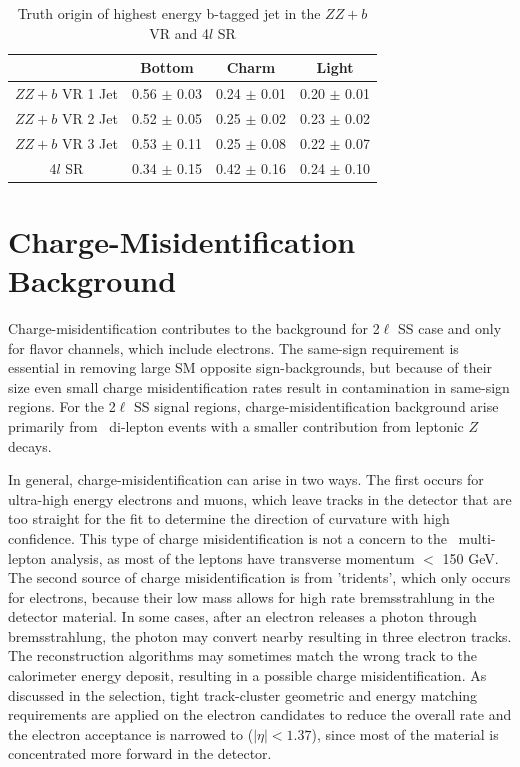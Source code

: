 \begin{table}[htbp]
\centering 
\begin{tabular}{|c|c|c|c|} 
  \hline
                 & Bottom      & Charm       & Light \\
  \hline
  $ZZ+b$ VR 1 Jet& 0.56 $\pm$ 0.03 & 0.24 $\pm$ 0.01 & 0.20 $\pm$ 0.01 \\ 
  $ZZ+b$ VR 2 Jet& 0.52 $\pm$ 0.05 & 0.25 $\pm$ 0.02 & 0.23 $\pm$ 0.02 \\ 
  $ZZ+b$ VR 3 Jet& 0.53 $\pm$ 0.11 & 0.25 $\pm$ 0.08 & 0.22 $\pm$ 0.07 \\
  4$l$ SR        & 0.34 $\pm$ 0.15 & 0.42 $\pm$ 0.16 & 0.24 $\pm$ 0.10 \\
  \hline 
\end{tabular}
\caption{Truth origin of highest energy b-tagged jet in the $ZZ+b$ VR and 4$l$ SR} 
\label{table:zz_truth}
\end{table} 


\section{Charge-Misidentification Background }
\label{section:qmis} 
Charge-misidentification contributes to the background for 2$\ell$ SS case and only for flavor channels, which include electrons. The same-sign requirement is essential in removing large SM opposite sign-backgrounds, but because of their size even small charge misidentification rates result in contamination in same-sign regions. For the 2$\ell$ SS signal regions, charge-misidentification background arise primarily from \ttbar\ di-lepton events with a smaller contribution from leptonic $Z$ decays. 

In general, charge-misidentification can arise in two ways. The first occurs for ultra-high energy electrons and muons, which leave tracks in the detector that are too straight for the fit to determine the direction of curvature with high confidence. This type of charge misidentification is not a concern to the \tth\ multi-lepton analysis, as most of the leptons have transverse momentum $<$ 150 GeV. The second source of charge misidentification is from 'tridents', which only occurs for electrons, because their low mass allows for high rate bremsstrahlung in the detector material. In some cases, after an electron releases a photon through bremsstrahlung, the photon may convert nearby resulting in three electron tracks. The reconstruction algorithms may sometimes match the wrong track to the calorimeter energy deposit, resulting in a possible charge misidentification. As discussed in the selection, tight track-cluster geometric and energy matching requirements are applied on the electron candidates to reduce the overall rate and the electron acceptance is narrowed to ($|\eta| < 1.37$), since most of the material is concentrated more forward in the detector. 

